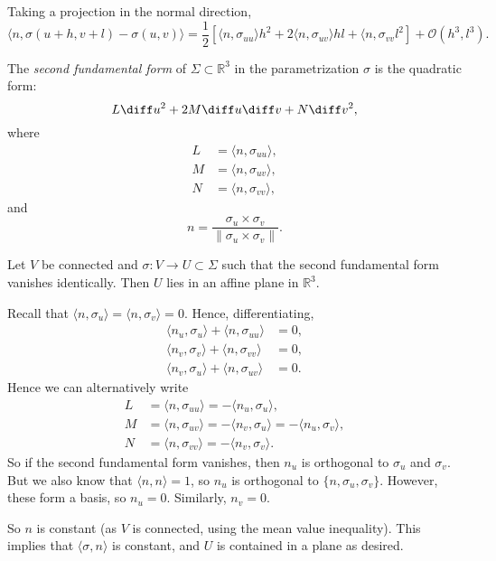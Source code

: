 \documentclass[12pt]{article}
\begin{document}
Taking a projection in the normal direction,
\[
	\langle n, \sigma(u+h,v+l)-\sigma(u,v)\rangle = \frac{1}{2}[\langle n, \sigma_{uu} \rangle h^2 + 2 \langle n, \sigma_{uv} \rangle hl + \langle n, \sigma_{vv} l^2] + \mathcal{O}(h^3, l^3)
.\]
\begin{definition}
	The \emph{second fundamental form} of $\Sigma \subset \mathbb{R}^3$ in the parametrization $\sigma$ is the quadratic form:
	\[
	L \diff u^2 + 2 M \diff u \diff v + N \diff v^2
	,\]
	where
	\begin{align*}
		L &= \langle n, \sigma_{uu}\rangle, \\
		M &= \langle n, \sigma_{uv} \rangle, \\
		N &= \langle n, \sigma_{vv} \rangle,
	\end{align*}
	and
	\[
		n = \frac{\sigma_u \times \sigma_v}{\| \sigma_u \times \sigma_v\|}
	.\]
\end{definition}

\begin{lemma}
	Let $V$ be connected and $\sigma : V \to U \subset \Sigma$ such that the second fundamental form vanishes identically. Then $U$ lies in an affine plane in $\mathbb{R}^3$.
\end{lemma}

\begin{proofbox}
	Recall that $\langle n, \sigma_u \rangle = \langle n, \sigma_v \rangle = 0$. Hence, differentiating,
	\begin{align*}
		\langle n_u, \sigma_u \rangle + \langle n, \sigma_{uu} \rangle &= 0, \\
		\langle n_v, \sigma_v \rangle + \langle n, \sigma_{vv} \rangle &= 0, \\
		\langle n_v, \sigma_u \rangle + \langle n, \sigma_{uv} \rangle &= 0.
	\end{align*}
	Hence we can alternatively write
	\begin{align*}
		L &= \langle n, \sigma_{uu} \rangle = - \langle n_u, \sigma_u \rangle, \\
		M &= \langle n, \sigma_{uv} \rangle = - \langle n_v, \sigma_u \rangle = - \langle n_u, \sigma_v \rangle, \\
		N &= \langle n, \sigma_{vv} \rangle = - \langle n_v, \sigma_v \rangle.
	\end{align*}
	So if the second fundamental form vanishes, then $n_u$ is orthogonal to $\sigma_u$ and $\sigma_v$. But we also know that $\langle n, n \rangle = 1$, so $n_u$ is orthogonal to $\{n, \sigma_u, \sigma_v\}$. However, these form a basis, so $n_u = 0$. Similarly, $n_v = 0$.

	So $n$ is constant (as $V$ is connected, using the mean value inequality). This implies that $\langle \sigma, n \rangle$ is constant, and $U$ is contained in a plane as desired.
\end{proofbox}
\end{document}
